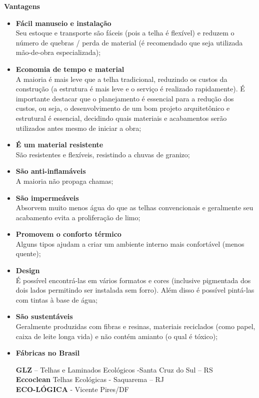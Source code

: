 \textbf{Vantagens}

\begin{itemize}
\item \textbf{Fácil manuseio e instalação}\\Seu estoque e transporte são fáceis (pois a telha é flexível) e reduzem o número de quebras / perda de material (é recomendado que seja utilizada mão-de-obra especializada);

\item \textbf{Economia de tempo e material}\\A maioria é mais leve que a telha
tradicional, reduzindo os custos da construção (a estrutura é mais leve e o
serviço é realizado rapidamente). É importante destacar que o planejamento é
essencial para a redução dos custos, ou seja, o desenvolvimento de um
bom projeto arquitetônico e estrutural é essencial, decidindo quais materiais
e acabamentos serão utilizados antes mesmo de iniciar a obra;

\item \textbf{É um material resistente}\\São resistentes e flexíveis, resistindo a chuvas de granizo;

\item \textbf{São anti-inflamáveis}\\A maioria não propaga chamas;

\item \textbf{São impermeáveis}\\Absorvem muito menos água do que as telhas convencionais e geralmente seu acabamento evita a proliferação de limo;

\item \textbf{Promovem o conforto térmico}\\Alguns tipos ajudam a criar um ambiente interno mais confortável (menos quente);

\item \textbf{Design}\\É possível encontrá-las em vários formatos e cores (inclusive pigmentada dos dois lados permitindo ser instalada sem forro). Além disso é possível pintá-las com tintas à base de água;

\item \textbf{São sustentáveis}\\Geralmente produzidas com fibras e resinas, materiais reciclados (como papel, caixa de leite longa vida) e não contém amianto (o qual é tóxico);

\item \textbf{Fábricas no Brasil}

\textbf{GLZ} – Telhas e Laminados Ecológicos -Santa Cruz do Sul – RS\\
\textbf{Eccoclean} Telhas Ecológicas - Saquarema – RJ\\
\textbf{ECO-LÓGICA} - Vicente Pires/DF

\end{itemize}

